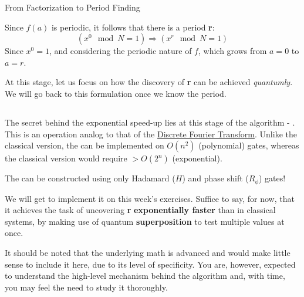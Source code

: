 \documentclass[aspectratio=43]{beamer}
\begin{document}
\begin{frame}{From Factorization to Period Finding}
    \begin{card}
        Since $f(a)$ is periodic, it follows that there is a period \textbf{r}:
        \begin{equation*}
            (x^0 \mod N = 1) \Rightarrow (x^r \mod N = 1)
        \end{equation*}
        Since $x^0=1$, and considering the periodic nature of $f$, which grows from $a=0$ to $a=r$.
    \end{card}
    \begin{card}
        At this stage, let us focus on how the discovery of \textbf{r} can be achieved \textit{quantumly}. We will go back to this formulation once we know the period.
    \end{card}
\pagenumber
\end{frame}

\subsection{\qft}
\begin{frame}{\qft}
    \begin{card}
        The secret behind the exponential speed-up lies at this stage of the algorithm - \qft. This is an operation analog to that of the \href{https://en.wikipedia.org/wiki/Discrete_Fourier_transform}{Discrete Fourier Transform}. Unlike the classical version, the \qft can be implemented on $O(n^2)$ (polynomial) gates, whereas the classical version would require $> O(2^n)$ (exponential).
    \end{card}
    \begin{card}
        The \qft can be constructed using only Hadamard ($H$) and phase shift ($R_{\phi}$) gates!
    \end{card}
\pagenumber
\end{frame}

\begin{frame}{\qft}
    \begin{card}
        We will get to implement it on this week's exercises. Suffice to say, for now, that it achieves the task of uncovering \textbf{r} \textbf{exponentially faster} than in classical systems, by making use of quantum \textbf{superposition} to test multiple values at once. 
    \end{card}
    \begin{card}
        It should be noted that the underlying math is advanced and would make little sense to include it here, due to its level of specificity. You are, however, expected to understand the high-level mechanism behind the algorithm and, with time, you may feel the need to study it thoroughly.
    \end{card}
\pagenumber
\end{frame}
\end{document}
